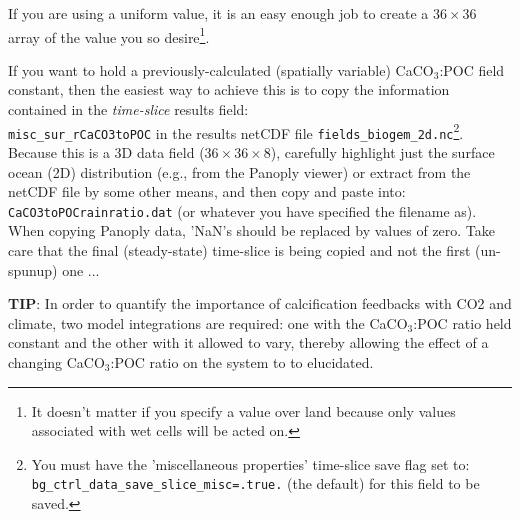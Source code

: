 \documentclass[10pt,twoside]{article}
\begin{document}
If you are using a uniform value, it is an easy enough job to create a \begin{math}36\times36\end{math} array of the value you so desire\footnote{It doesn't matter if you specify a value over land because only values associated with wet cells will be acted on.}.

If you want to hold a previously-calculated (spatially variable) CaCO\begin{math}_3\end{math}:POC field constant, then the easiest way to achieve this is to copy the information contained in the \textit{time-slice} results field:\\
\texttt{misc\_sur\_rCaCO3toPOC} in the results netCDF file \texttt{fields\_biogem\_2d.nc}\footnote{You must have the 'miscellaneous properties' time-slice save flag set to:\\
\texttt{bg\_ctrl\_data\_save\_slice\_misc=.true.} (the default) for this field to be saved.}. Because this is a 3D data field (\begin{math}36\times36\times8\end{math}), carefully highlight just the surface ocean (2D) distribution (e.g., from the Panoply viewer) or extract from the netCDF file by some other means, and then copy and paste into:\\
\texttt{CaCO3toPOCrainratio.dat} (or whatever you have specified the filename as). When copying Panoply data, 'NaN's should be replaced by values of zero. Take care that the final (steady-state) time-slice is being copied and not the first (un-spunup) one ...

\textbf{TIP}: In order to quantify the importance of calcification feedbacks with CO2 and climate, two model integrations are required: one with the CaCO\begin{math}_3\end{math}:POC ratio held constant and the other with it allowed to vary, thereby allowing the effect of a changing CaCO\begin{math}_3\end{math}:POC ratio on the system to to elucidated.



\end{document}
